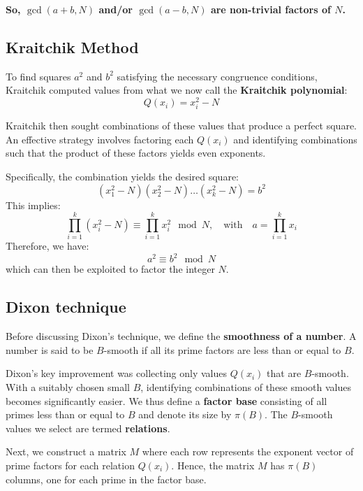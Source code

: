 \documentclass[a4paper, 11pt]{article}
\begin{document}
\textbf{So, $\gcd(a+b,N)$ and/or $\gcd(a-b,N)$ are non-trivial factors of $N$.}

\subsection{Kraitchik Method}

To find squares $a^2$ and $b^2$ satisfying the necessary congruence conditions, Kraitchik \cite{Kraitchik1929Factorisation} computed values from what we now call the \textbf{Kraitchik polynomial}:
\begin{equation}
Q(x_i) = x_i^2 - N
\end{equation}

Kraitchik then sought combinations of these values that produce a perfect square. An effective strategy involves factoring each $Q(x_i)$ and identifying combinations such that the product of these factors yields even exponents.

Specifically, the combination yields the desired square:
\begin{equation}
    (x_1^2 - N)(x_2^2 - N) \dots (x_k^2 - N) = b^2
\end{equation}
This implies:
\begin{equation}
    \prod_{i=1}^{k} (x_i^2 - N) \equiv \prod_{i=1}^{k} x_i^2 \mod N, \quad \text{with} \quad a = \prod_{i=1}^{k} x_i
\end{equation}
Therefore, we have:
\begin{equation}
    a^2 \equiv b^2 \mod N
\end{equation}
which can then be exploited to factor the integer $N$.

\subsection{Dixon technique}

Before discussing Dixon's technique, we define the \textbf{smoothness of a number}. A number is said to be $B$-smooth if all its prime factors are less than or equal to $B$.

Dixon's \cite{Dixon1981} key improvement was collecting only values $Q(x_i)$ that are $B$-smooth. With a suitably chosen small $B$, identifying combinations of these smooth values becomes significantly easier. We thus define a \textbf{factor base} consisting of all primes less than or equal to $B$ and denote its size by $\pi(B)$. The $B$-smooth values we select are termed \textbf{relations}.

Next, we construct a matrix $M$ where each row represents the exponent vector of prime factors for each relation $Q(x_i)$. Hence, the matrix $M$ has $\pi(B)$ columns, one for each prime in the factor base.
\end{document}
